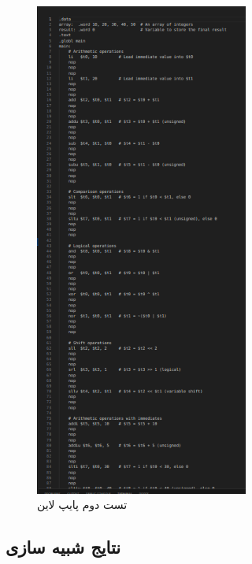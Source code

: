 \documentclass[11pt, a4paper]{article}
\begin{document}
	\begin{figure}[H]
		\begin{center}
			\includegraphics[width=7cm]{Photos/11.png}
		\end{center}
		\caption{تست دوم پایپ لاین}
		\label{mips2_pipeline}
	\end{figure}
	
	
	\subsection{نتایج شبیه سازی}
	
\end{document}
